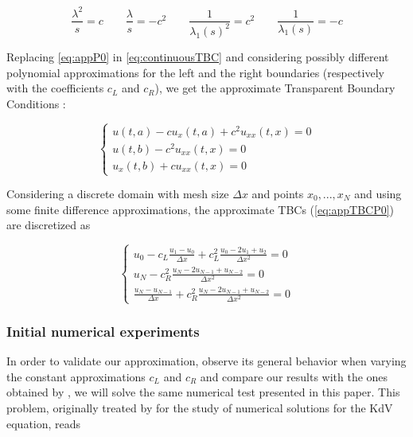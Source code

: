 \begin{equation}
	\label{eq:appP0}
	\frac{\lambda^2}{s}  = c \qquad
	\frac{\lambda}{s}  = -c^2 \qquad
	\frac{1}{\lambda_1(s)^2}  = c^2\qquad 
	 \frac{1}{\lambda_1(s)}  = -c 
\end{equation}

\indent Replacing \eqref{eq:appP0} in \eqref{eq:continuousTBC} and considering possibly different polynomial approximations for the left and the right boundaries (respectively with the coefficients $c_L$ and $c_R$), we get the approximate Transparent Boundary Conditions : 

\begin{equation}
\label{eq:appTBCP0}
    \begin{cases}
        u(t,a) - c u_x(t,a)  + c^2  u_{xx}(t,x) = 0 \\
        u(t,b) - c^2    u_{xx}(t,x) = 0 \\
        u_x(t,b) + c u_{xx}(t,x)= 0 
    \end{cases}
\end{equation}

\indent Considering a discrete domain with mesh size $\Delta x$ and points $x_0, ..., x_N$ and using some finite difference approximations, the approximate TBCs (\ref{eq:appTBCP0}) are discretized as

\begin{equation}
\label{eq:appDiscTBCP0}
    \begin{cases}
        u_0 - c_L \frac{u_1 - u_0}{\Delta x}  + c_L^2  \frac{u_0 -2u_1 + u_2}{\Delta x^2} = 0 \\
        u_N - c_R^2    \frac{u_N -2u_{N-1} + u_{N-2}}{\Delta x^2} = 0 \\
        \frac{u_N - u_{N-1}}{\Delta x}  + c_R^2    \frac{u_N -2u_{N-1} + u_{N-2}}{\Delta x^2} = 0 
    \end{cases}
\end{equation}

\subsubsection{Initial numerical experiments}

\indent In order to validate our approximation, observe its general behavior when varying the constant approximations $c_L$ and $c_R$ and compare our results with the ones obtained by \cite{besse2015}, we will solve the same numerical test presented in this paper. This problem,  originally treated by \cite{zheng2008} for the study of numerical solutions for the KdV equation, reads

